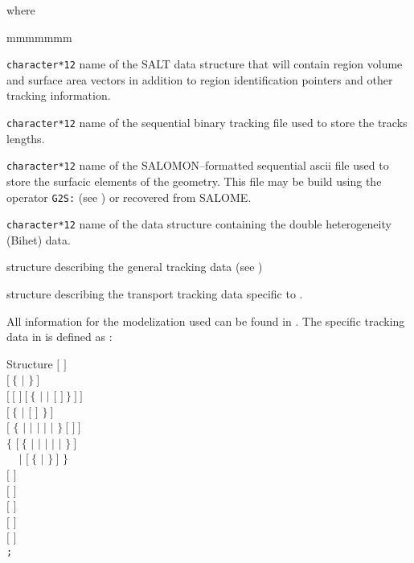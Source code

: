 \noindent  where
\begin{ListeDeDescription}{mmmmmmm}

\item[\dusa{TRKNAM}] \texttt{character*12} name of the SALT  data
structure that will contain region volume and surface area vectors in
addition to region identification pointers and other tracking information.

\item[\dusa{TRKFIL}] \texttt{character*12} name of the sequential binary tracking
file used to store the tracks lengths.

\item[\dusa{SURFIL}] \texttt{character*12} name of the SALOMON--formatted sequential {\sc ascii}
file used to store the surfacic elements of the geometry. This file may be build
using the operator {\tt G2S:} (see ) or recovered from SALOME.

\item[\dusa{GEONAM}] {\tt character*12} name of the  data
structure containing the double heterogeneity (Bihet) data.

\item[\dstr{desctrack}] structure describing the general tracking data (see
)

\item[\dstr{descsalt}] structure describing the transport tracking data
specific to .

\end{ListeDeDescription}

\vskip 0.2cm

All information for the modelization used can be found in .
The  specific tracking data in  is defined as :

\begin{DataStructure}{Structure }
$[$   $]$ \\
$[~\{$   $|$  $\}~]$ \\
$[~[$   $]~[~\{$  $|$  $|$  $[$  $]~\}~]~]$ \\
$[~\{$  $|$  $[$   $]$ $\}~]$ \\
$[$ $\{$   $|$  $|$  $|$  $|$  $|$  $\}~[$  $]~]$ \\
$\{$  $[~\{$  $|$  $|$  $|$  $|$  $|$  $\}~]$   \\
$~~~~~|$  $[~\{$  $|$  $\}~]$   $\}$ \\
$[$   $]$ \\
$[$  $]$\\
$[$   $]$ \\
$[$  $]$\\
$[$  $]$\\
{\tt ;}
\end{DataStructure}

